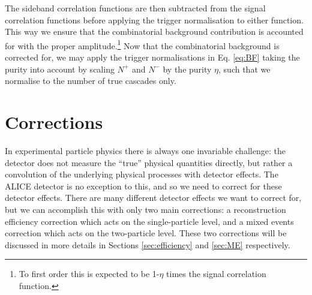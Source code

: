   The sideband correlation functions are then subtracted from the signal correlation functions before applying the trigger normalisation to either function. This way we ensure that the combinatorial background contribution is accounted for with the proper amplitude.\footnote{To first order this is expected to be 1-$\eta$ times the signal correlation function.} Now that the combinatorial background is corrected for, we may apply the trigger normalisations in Eq. \ref{eq:BF} taking the purity into account by scaling $N^+$ and $N^-$ by the purity $\eta$, such that we normalise to the number of true cascades only.


\section{Corrections}
\label{sec:corrections}
  In experimental particle physics there is always one invariable challenge: the detector does not measure the ``true'' physical quantities directly, but rather a convolution of the underlying physical processes with detector effects. The ALICE detector is no exception to this, and so we need to correct for these detector effects. There are many different detector effects we want to correct for, but we can accomplish this with only two main corrections: a reconstruction efficiency correction which acts on the single-particle level, and a mixed events correction which acts on the two-particle level. These two corrections will be discussed in more details in Sections \ref{sec:efficiency} and \ref{sec:ME} respectively.

